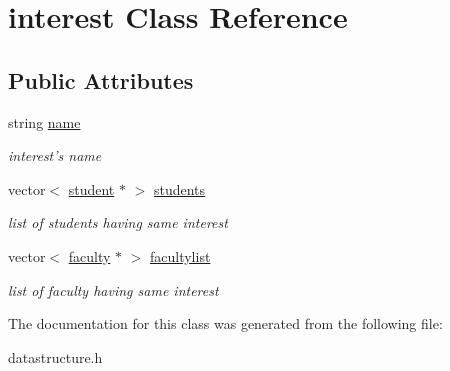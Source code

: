 \hypertarget{classinterest}{\section{interest \-Class \-Reference}
\label{classinterest}
}
\subsection*{\-Public \-Attributes}
\begin{DoxyCompactItemize}
\item 
\hypertarget{classinterest_ad4f9b05aaa9dfcd33cccab6ace5f6c01}{string \hyperlink{classinterest_ad4f9b05aaa9dfcd33cccab6ace5f6c01}{name}}\label{classinterest_ad4f9b05aaa9dfcd33cccab6ace5f6c01}

\begin{DoxyCompactList}\small\item\em interest's name \end{DoxyCompactList}\item 
\hypertarget{classinterest_a0bad7cfb79042457dda9f8a3621c0f26}{vector$<$ \hyperlink{classstudent}{student} $\ast$ $>$ \hyperlink{classinterest_a0bad7cfb79042457dda9f8a3621c0f26}{students}}\label{classinterest_a0bad7cfb79042457dda9f8a3621c0f26}

\begin{DoxyCompactList}\small\item\em list of students having same interest \end{DoxyCompactList}\item 
\hypertarget{classinterest_a78cc717ab49e561a42f9ee0ca2cb0324}{vector$<$ \hyperlink{classfaculty}{faculty} $\ast$ $>$ \hyperlink{classinterest_a78cc717ab49e561a42f9ee0ca2cb0324}{facultylist}}\label{classinterest_a78cc717ab49e561a42f9ee0ca2cb0324}

\begin{DoxyCompactList}\small\item\em list of faculty having same interest \end{DoxyCompactList}\end{DoxyCompactItemize}


\-The documentation for this class was generated from the following file\-:\begin{DoxyCompactItemize}
\item 
datastructure.\-h\end{DoxyCompactItemize}
